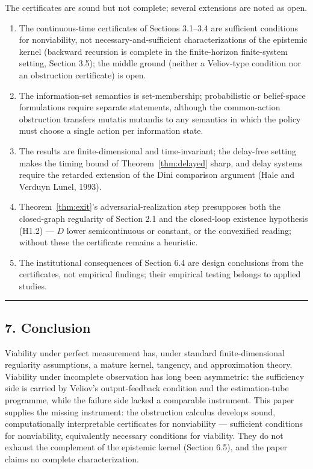 \documentclass[11pt]{article}
\theoremstyle{definition}
\providecommand{\tightlist}{\setlength{\itemsep}{0pt}\setlength{\parskip}{0pt}}
\begin{document}
The certificates are sound but not complete; several extensions are noted as open.

\begin{enumerate}
\def\labelenumi{(\roman{enumi})}
\tightlist
\item
  The continuous-time certificates of Sections 3.1--3.4 are sufficient conditions for nonviability, not necessary-and-sufficient characterizations of the epistemic kernel (backward recursion is complete in the finite-horizon finite-system setting, Section 3.5); the middle ground (neither a Veliov-type condition nor an obstruction certificate) is open.
\item
  The information-set semantics is set-membership; probabilistic or belief-space formulations require separate statements, although the common-action obstruction transfers mutatis mutandis to any semantics in which the policy must choose a single action per information state.
\item
  The results are finite-dimensional and time-invariant; the delay-free setting makes the timing bound of Theorem~\ref{thm:delayed} sharp, and delay systems require the retarded extension of the Dini comparison argument (Hale and Verduyn Lunel, 1993).
\item
  Theorem~\ref{thm:exit}'s adversarial-realization step presupposes both the closed-graph regularity of Section 2.1 and the closed-loop existence hypothesis (H1.2) --- \(D\) lower semicontinuous or constant, or the convexified reading; without these the certificate remains a heuristic.
\item
  The institutional consequences of Section 6.4 are design conclusions from the certificates, not empirical findings; their empirical testing belongs to applied studies.
\end{enumerate}

\begin{center}\rule{0.5\linewidth}{0.5pt}\end{center}

\subsection{7. Conclusion}\label{conclusion}

Viability under perfect measurement has, under standard
finite-dimensional regularity assumptions, a mature kernel, tangency,
and approximation theory. Viability under incomplete observation has
long been asymmetric: the sufficiency side is carried by Veliov's
output-feedback condition and the estimation-tube programme, while the
failure side lacked a comparable instrument. This paper supplies the missing instrument: the obstruction calculus develops sound, computationally interpretable certificates for nonviability --- sufficient conditions for nonviability, equivalently necessary conditions for viability. They do not exhaust the complement of the epistemic kernel (Section 6.5), and the paper claims no complete characterization.
\end{document}
